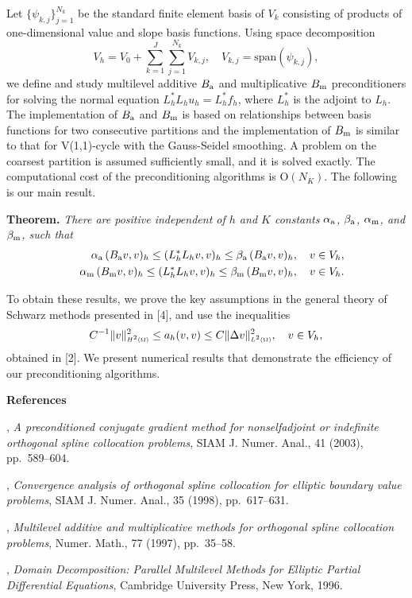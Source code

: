 \documentclass{report}
\begin{document}
Let $\{\psi_{k,j}\}_{j=1}^{N_k}$ be the standard finite element basis
of $V_k$ consisting of products of one-dimensional value and slope
basis functions. Using space decomposition
\[
V_h=V_0+\sum_{k=1}^{J}\sum_{j=1}^{N_k}V_{k,j}, \quad V_{k,j}
= \mbox{span}(\psi_{k,j}),
\]
we define and study multilevel additive $B_{\textup{\scriptsize a}}$
and multiplicative $B_{\textup{\scriptsize m}}$ preconditioners for
solving the normal equation $L_h^*L_hu_h=L_h^*f_h$, where $L_h^*$
is
the adjoint to $L_h$. The implementation of $B_{\textup{\scriptsize
a}}$ and $B_{\textup{\scriptsize m}}$ is based on relationships
between basis functions for two consecutive partitions and the
implementation of $B_{\textup{\scriptsize m}}$ is similar to that
for
V(1,1)-cycle with the Gauss-Seidel smoothing. A problem on the
coarsest partition is assumed sufficiently small, and it is solved
exactly. The computational cost of the preconditioning algorithms
is
$\mbox{O}(N_K)$. The following is our main result.

\textbf{Theorem.}
{\em There are positive independent of $h$ and $K$ constants
$\alpha_{\textup{\scriptsize a}}$, $\beta_{\textup{\scriptsize a}}$,
$\alpha_{\textup{\scriptsize m}}$, and $\beta_{\textup{\scriptsize m}}$,
such that}
\begin{eqnarray}
\label{eq:spectral_equiv}
&&\alpha_{\textup{\scriptsize a}}\, (B_{\textup{\scriptsize a}}v,v)_h
\leq (L_h^*L_hv,v)_h \leq
\beta_{\textup{\scriptsize a}}\,
(B_{\textup{\scriptsize a}}v,v)_h,\quad v\in V_h,
\\\nonumber
&&\alpha_{\textup{\scriptsize m}}\,
(B_{\textup{\scriptsize m}}v,v)_h
\leq (L_h^*L_hv,v)_h \leq \beta_{\textup{\scriptsize m}}\,
(B_{\textup{\scriptsize m}}v,v)_h,\quad v\in V_h.
\end{eqnarray}



To obtain these results, we prove the key assumptions in the general
theory of Schwarz methods presented in [4], and use the inequalities
\[
C^{-1}\|v\|_{\mbox{$\scriptscriptstyle H^{2}(\Omega)$}}^2\leq a_h(v,v)\leq C\|\Delta v\|_{\mbox{$\scriptscriptstyle L^{2}(\Omega)$}}^2,\quad v\in V_h,
\]
obtained in [2]. We present numerical results that demonstrate
the efficiency of our preconditioning algorithms.

\bigskip
\noindent
\textbf{References}

\medskip
{}, {\em A preconditioned conjugate
gradient method for nonselfadjoint or indefinite orthogonal spline
collocation problems}, SIAM J. Numer. Anal., 41 (2003), pp.~589--604.

\medskip
{}, {\em Convergence analysis of orthogonal
spline
collocation for elliptic boundary value problems}, SIAM J. Numer.
Anal., 35 (1998),
pp.~617--631.

\medskip
{}, {\em Multilevel additive and
multiplicative methods for orthogonal spline collocation problems},
Numer. Math., 77 (1997), pp.~35--58.

\medskip
{},
{\em Domain Decomposition: Parallel Multilevel Methods for Elliptic Partial
Differential Equations}, Cambridge University Press, New York, 1996.
\end{document}

